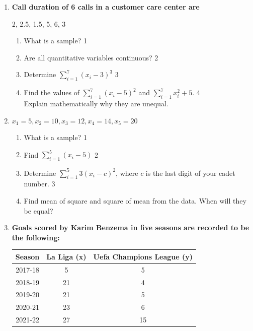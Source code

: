 \documentclass[a4paper,oneside]{book}
\begin{document}
\begin{enumerate}
  
   \item
  \textbf{Call duration of 6 calls in a customer care center are}
  
  \begin{center}
  2, 2.5, 1.5, 5, 6, 3
  \end{center}
 
  \begin{enumerate}
    \item
	What is a sample? \hfill 1
    \item
    	Are all quantitative variables continuous?  \hfill 2
    \item
    	Determine $\displaystyle \sum_{i=1}^7 (x_i-3)^3$ \hfill 3
     \item
     	Find the values of  $\displaystyle \sum_{i=1}^7 (x_i-5)^2$ and $\displaystyle \sum_{i=1}^7 x_i^2+5.$  \hfill 4 \\
     	Explain mathematically why they are unequal.
  \end{enumerate}
  
   \item
     \begin{center}
  \textbf{$x_1 = 5, x_2 = 10, x_3 = 12, x_4 = 14, x_5 = 20$}
  \end{center}
 
  \begin{enumerate}
    \item
	What is a sample? \hfill 1
    \item
    	Find $\displaystyle \sum_{i=1}^5 (x_i-5)$ \hfill 2
    \item
    	Determine $\displaystyle \sum_{i=1}^5 3(x_i-c)^2$, where $c$ is the last digit of your cadet number.   \hfill 3
     \item
     	Find mean of square and square of mean from the data. When will they be equal?
  \end{enumerate}
    
  
   \item
	  \textbf{Goals scored by Karim Benzema in five seasons are recorded to be the following:} 
	  
	  \begin{table}[h]
	  \centering
\begin{tabular}{c|c|c}
Season & La Liga (x) & Uefa Champions League (y) \\ \hline
2017-18 & 5 & 5 \\ 
2018-19 & 21 & 4 \\
2019-20 & 21 & 5 \\
2020-21 & 23 & 6 \\ 
2021-22 & 27 & 15 \\ \hline
\end{tabular}
\end{table}
  

\end{enumerate}
\end{document}
